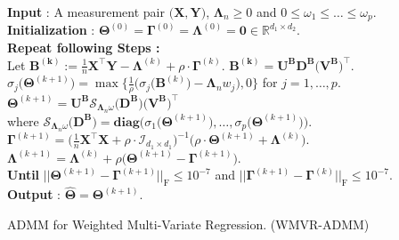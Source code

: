 \documentclass[12pt]{article}
\begin{document}
\begin{algorithm}[t] 
    \textbf{Input} : A measurement pair $\big( \boldsymbol{X}, \boldsymbol{Y} \big)$, $\boldsymbol{\Lambda}_{n} \geq 0$ and $0\leq \omega_{1} \leq \dots \leq \omega_{p}$. \\
    \textbf{Initialization} : $\boldsymbol{\Theta}^{(0)}=\boldsymbol{\Gamma}^{(0)}=\boldsymbol{\Lambda}^{(0)}=\boldsymbol{0} \in\mathbb{R}^{d_{1}\times d_{2}}$. \\
    {\bf Repeat following Steps :} \\
     Let $\boldsymbol{B^{(k)}}:=\frac{1}{n}\boldsymbol{X}^{\top}\boldsymbol{Y}-\boldsymbol{\Lambda}^{(k)}+\rho \cdot \boldsymbol{\Gamma}^{(k)}$.
    \quad $\boldsymbol{B^{(k)}}=\boldsymbol{U}^{\textbf{B}}\boldsymbol{D}^{\textbf{B}}\big(\boldsymbol{V}^{\textbf{B}}\big)^{\top}$. \\
    \qquad \qquad \qquad $\sigma_{j}\big(\boldsymbol{\Theta}^{(k+1)}\big)=\max\bigg\{\frac{1}{\rho}\big(\sigma_{j}(\boldsymbol{B}^{(k)}\big)-\boldsymbol{\Lambda}_{n} w_{j}\big),0 \bigg\}$ for $j=1,\dots,p$. \\
    \qquad \qquad \qquad $\boldsymbol{\Theta}^{(k+1)} = \boldsymbol{U}^{\textbf{B}}\mathcal{S}_{\boldsymbol{\Lambda}_{n}\omega}\big(\boldsymbol{D}^{\textbf{B}}\big)\big(\boldsymbol{V}^{\textbf{B}}\big)^{\top}$\\ 
    \qquad \qquad \qquad \qquad \qquad \qquad where $\mathcal{S}_{\boldsymbol{\Lambda}_{n}\omega}\big(\boldsymbol{D}^{\textbf{B}}\big)=\textbf{diag}\big( \sigma_{1}\big(\boldsymbol{\Theta}^{(k+1)}\big),\dots,\sigma_{p}\big(\boldsymbol{\Theta}^{(k+1)}\big) \big)$.  \\
    $\boldsymbol{\Gamma}^{(k+1)} = \big( \frac{1}{n}\boldsymbol{X}^{\top}\boldsymbol{X}+\rho\cdot\mathcal{I}_{d_{1} \times d_{1}} \big)^{-1}\big( \rho \cdot \boldsymbol{\Theta}^{(k+1)} + \boldsymbol{\Lambda}^{(k)} \big).$\\
     $\boldsymbol{\Lambda}^{(k+1)} = \boldsymbol{\Lambda}^{(k)} + \rho\big( \boldsymbol{\Theta}^{(k+1)}-\boldsymbol{\Gamma}^{(k+1)} \big)$.\\
    {\bf Until} $|| \boldsymbol{\Theta}^{(k+1)}-\boldsymbol{\Gamma}^{(k+1)} ||_{\text{F}}\leq 10^{-7}$ and $|| \boldsymbol{\Gamma}^{(k+1)}-\boldsymbol{\Gamma}^{(k)} ||_{\text{F}}\leq 10^{-7}$. \\
    \textbf{Output} : $\widehat{\boldsymbol{\Theta}}=\boldsymbol{\Theta}^{(k+1)}$. 
    \caption{ADMM for Weighted Multi-Variate Regression. (WMVR-ADMM)}
    \label{alg:1}
\end{algorithm}
\end{document}
